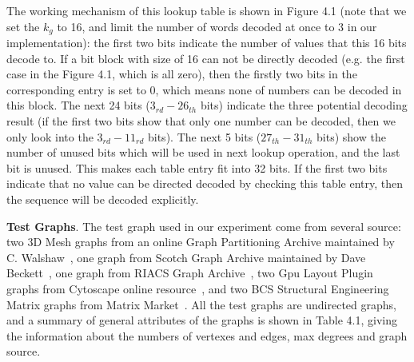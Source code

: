 \documentclass[12pt,glossary]{dalthesis}
\begin{document}
\bigskip

The working mechanism of this lookup table is shown in Figure 4.1 (note that we set the $k_{g}$ to 16, and limit the number of words decoded at once to 3 in our implementation): the first two bits indicate the number of values that this 16 bits decode to. If a bit block with size of 16 can not be directly decoded (e.g. the first case in the Figure 4.1, which is all zero), then the firstly two bits in the corresponding entry is set to 0, which means none of numbers can be decoded in this block. The next 24 bits ($3_{rd} - 26_{th}$ bits) indicate the three potential decoding result (if the first two bits show that only one number can be decoded, then we only look into the $3_{rd} - 11_{rd}$ bits). The next 5 bits ($27_{th} - 31_{th}$ bits) show the number of unused bits which will be used in next lookup operation, and the last bit is unused. This makes each table entry fit into 32 bits. If the first two bits indicate that no value can be directed decoded by checking this table entry, then the sequence will be decoded explicitly.

\textbf{Test Graphs}. The test graph used in our experiment come from several source: two 3D Mesh graphs from an online Graph Partitioning Archive maintained by C. Walshaw~\cite{3DMESH}, one graph from Scotch Graph Archive maintained by Dave Beckett~\cite{Scotch}, one graph from RIACS Graph Archive~\cite{RIACS}, two Gpu Layout Plugin graphs from Cytoscape online resource~\cite{Cytoscape}, and two BCS Structural Engineering Matrix graphs from Matrix Market~\cite{Matrix}. All the test graphs are undirected graphs, and a summary of general attributes of the graphs is shown in Table 4.1, giving the information about the numbers of vertexes and edges, max degrees and graph source.
\end{document}
